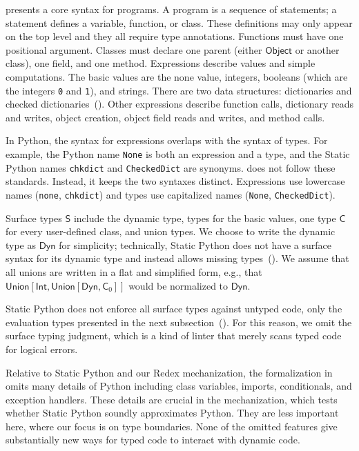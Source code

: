 \documentclass[english,cleveref,crc]{programming}
\newcommand{\SP}{Static Python}
\newcommand{\code}[1]{\texttt{#1}}
\newcommand{\typefont}[1]{\mathsf{#1}}
\newcommand{\paramtype}[2]{#1[#2]}
\newcommand{\sptype}{\typefont{S}}
\newcommand{\sptclass}{\typefont{C}}
\newcommand{\sptint}{\typefont{Int}}
\newcommand{\sptdyn}{\typefont{Dyn}}
\newcommand{\sptobject}{\typefont{Object}}
\newcommand{\sptunion}[1]{\paramtype{\typefont{Union}}{#1}}
\begin{document}
 presents a core syntax for programs.
A program is a sequence of statements;
a statement defines a variable, function, or class.
These definitions may only appear on the top level
and they all require type annotations.
Functions must have one positional argument.
Classes must declare one parent (either $\sptobject$ or another class), one field, and one method.
Expressions describe values and simple computations.
The basic values are the none value, integers,
booleans (which are the integers \code{0} and \code{1}), and strings.
There are two data structures: dictionaries and checked dictionaries~().
Other expressions describe function calls, dictionary reads and writes,
object creation, object field reads and writes, and method calls.

In Python, the syntax for expressions overlaps with the syntax of types.
For example, the Python name \code{None} is both an expression and a type,
and the \SP{} names \code{chkdict} and \code{CheckedDict} are synonyms.
 does not follow these standards.
Instead, it keeps the two syntaxes distinct.
Expressions use lowercase names (\code{none}, \code{chkdict}) and types use capitalized
names (\code{None}, \code{CheckedDict}).

Surface types $\sptype$ include the dynamic type, types for the basic values, one type $\sptclass$ for every
user-defined class, and union types.
We choose to write the dynamic type as $\sptdyn$ for simplicity; technically,
\SP{} does not have a surface syntax for its dynamic
type and instead allows missing types~().
We assume that all unions are written in a flat and simplified form, e.g., that
$\sptunion{\sptint, \sptunion{\sptdyn, \sptclass_0}}$ would be normalized to $\sptdyn$.

\SP{} does not enforce all surface types against untyped code, only the evaluation
types presented in the next subsection~().
For this reason, we omit the surface typing judgment, which is a kind of linter
that merely scans typed code for logical errors.

Relative to \SP{} and our Redex mechanization, the formalization in  omits
many details of Python including class variables, imports, conditionals, and exception handlers.
These details are crucial in the mechanization, which tests whether \SP{}
soundly approximates Python.
They are less important here, where our focus is on type boundaries.
None of the omitted features give substantially new ways for typed code to interact with dynamic code.
\end{document}
